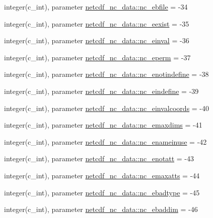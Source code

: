 \begin{DoxyCompactItemize}
\item 
integer(c\+\_\+int), parameter \hyperlink{namespacenetcdf__nc__data_a960115687ca85c5f961d7131ced33af5}{netcdf\+\_\+nc\+\_\+data\+::nc\+\_\+ebfile} = -\/34
\item 
integer(c\+\_\+int), parameter \hyperlink{namespacenetcdf__nc__data_ae45b7ca9441ed8700786c8b8642be8e5}{netcdf\+\_\+nc\+\_\+data\+::nc\+\_\+eexist} = -\/35
\item 
integer(c\+\_\+int), parameter \hyperlink{namespacenetcdf__nc__data_aa263f8b87e0538e1c947b770033b48b4}{netcdf\+\_\+nc\+\_\+data\+::nc\+\_\+einval} = -\/36
\item 
integer(c\+\_\+int), parameter \hyperlink{namespacenetcdf__nc__data_a83704d0b26c22b373336ea1e97ad798d}{netcdf\+\_\+nc\+\_\+data\+::nc\+\_\+eperm} = -\/37
\item 
integer(c\+\_\+int), parameter \hyperlink{namespacenetcdf__nc__data_a48dc2fa7138496eb1e88d440796aad4c}{netcdf\+\_\+nc\+\_\+data\+::nc\+\_\+enotindefine} = -\/38
\item 
integer(c\+\_\+int), parameter \hyperlink{namespacenetcdf__nc__data_ad19d2f76daf245eedf8e951ee0d82a3a}{netcdf\+\_\+nc\+\_\+data\+::nc\+\_\+eindefine} = -\/39
\item 
integer(c\+\_\+int), parameter \hyperlink{namespacenetcdf__nc__data_a317c9857752eb82e751a13a1310cffab}{netcdf\+\_\+nc\+\_\+data\+::nc\+\_\+einvalcoords} = -\/40
\item 
integer(c\+\_\+int), parameter \hyperlink{namespacenetcdf__nc__data_a2fab3352811943122732cf9dabd6230a}{netcdf\+\_\+nc\+\_\+data\+::nc\+\_\+emaxdims} = -\/41
\item 
integer(c\+\_\+int), parameter \hyperlink{namespacenetcdf__nc__data_a07f351a61b65f52e5bb67d3bc15f87d6}{netcdf\+\_\+nc\+\_\+data\+::nc\+\_\+enameinuse} = -\/42
\item 
integer(c\+\_\+int), parameter \hyperlink{namespacenetcdf__nc__data_adedcd537ac75b8f3ea97ee278f7a61f9}{netcdf\+\_\+nc\+\_\+data\+::nc\+\_\+enotatt} = -\/43
\item 
integer(c\+\_\+int), parameter \hyperlink{namespacenetcdf__nc__data_aa455239c6123d7b9db4fd6e67da4d46e}{netcdf\+\_\+nc\+\_\+data\+::nc\+\_\+emaxatts} = -\/44
\item 
integer(c\+\_\+int), parameter \hyperlink{namespacenetcdf__nc__data_a5f5ae403076d792021fd714a24bc2e7b}{netcdf\+\_\+nc\+\_\+data\+::nc\+\_\+ebadtype} = -\/45
\item 
integer(c\+\_\+int), parameter \hyperlink{namespacenetcdf__nc__data_aed9c733c3cdb4e6cd5544fbc240739df}{netcdf\+\_\+nc\+\_\+data\+::nc\+\_\+ebaddim} = -\/46

\end{DoxyCompactItemize}
